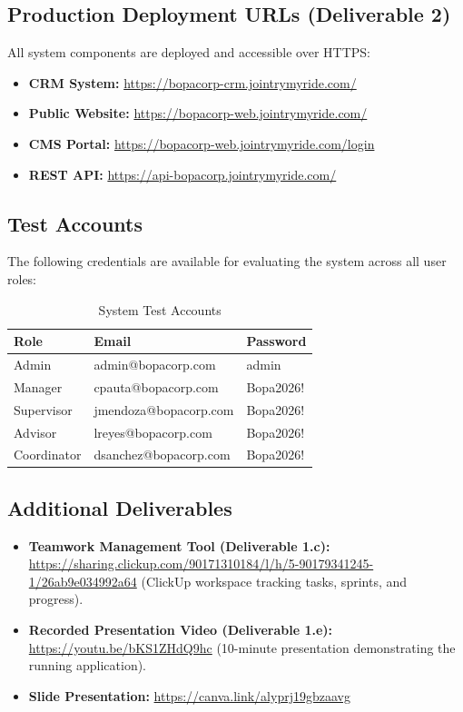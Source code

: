 \documentclass[letterpaper%
, oneside%
, 12pt%
, memoireprojet%
, english%
,creativecommons,hyperref, withAlgo2e %
]{thETS}
\begin{document}
\subsection{Production Deployment URLs (Deliverable 2)}
All system components are deployed and accessible over HTTPS:
\begin{itemize}
    \item \textbf{CRM System:} \url{https://bopacorp-crm.jointrymyride.com/}
    \item \textbf{Public Website:} \url{https://bopacorp-web.jointrymyride.com/}
    \item \textbf{CMS Portal:} \url{https://bopacorp-web.jointrymyride.com/login}
    \item \textbf{REST API:} \url{https://api-bopacorp.jointrymyride.com/}
\end{itemize}

\subsection{Test Accounts}
The following credentials are available for evaluating the system across all user roles:

\begin{table}[H]
\centering
\begin{tabular}{|l|l|l|}
\hline
\textbf{Role} & \textbf{Email} & \textbf{Password} \\ \hline
Admin & admin@bopacorp.com & admin \\ \hline
Manager & cpauta@bopacorp.com & Bopa2026! \\ \hline
Supervisor & jmendoza@bopacorp.com & Bopa2026! \\ \hline
Advisor & lreyes@bopacorp.com & Bopa2026! \\ \hline
Coordinator & dsanchez@bopacorp.com & Bopa2026! \\ \hline
\end{tabular}
\caption{System Test Accounts}
\label{tab:test_accounts}
\end{table}

\subsection{Additional Deliverables}
\begin{itemize}
    \item \textbf{Teamwork Management Tool (Deliverable 1.c):} \url{https://sharing.clickup.com/90171310184/l/h/5-90179341245-1/26ab9e034992a64} (ClickUp workspace tracking tasks, sprints, and progress).
    \item \textbf{Recorded Presentation Video (Deliverable 1.e):} \url{https://youtu.be/bKS1ZHdQ9hc} (10-minute presentation demonstrating the running application).
    \item \textbf{Slide Presentation:} \url{https://canva.link/alyprj19gbzaavg}
\end{itemize}
\end{document}
